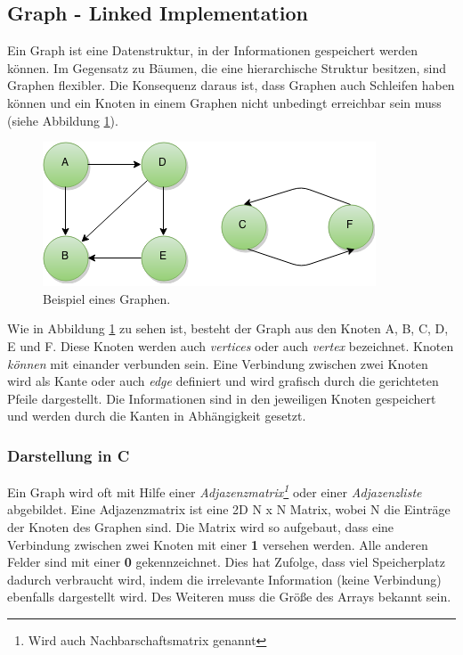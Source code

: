 \subsection{Graph - Linked Implementation}\label{kap:graph} 
Ein Graph ist eine Datenstruktur, in der Informationen gespeichert werden können. Im Gegensatz zu Bäumen, die eine hierarchische Struktur besitzen, sind Graphen flexibler. Die Konsequenz daraus ist, dass Graphen auch Schleifen haben können und ein Knoten in einem Graphen nicht unbedingt erreichbar sein muss (siehe Abbildung \ref{fig:Graph}).
\begin{figure}[h]
	\centering
	\includegraphics[scale=0.5]{images/Graph.png} 
	\caption{Beispiel eines Graphen.}
	\label{fig:Graph}
\end{figure}
Wie in Abbildung \ref{fig:Graph} zu sehen ist, besteht der Graph aus den Knoten A, B, C, D, E und F. Diese Knoten werden auch \textit{vertices} oder auch \textit{vertex} bezeichnet. Knoten \textit{können} mit einander verbunden sein. Eine Verbindung zwischen zwei Knoten wird als Kante oder auch \textit{edge} definiert und wird grafisch durch die gerichteten Pfeile dargestellt. Die Informationen sind in den jeweiligen Knoten gespeichert und werden durch die Kanten in Abhängigkeit gesetzt. 

\subsubsection*{Darstellung in C}
Ein Graph wird oft mit Hilfe einer \textit{Adjazenzmatrix\footnote{Wird auch Nachbarschaftsmatrix genannt}} oder einer \textit{Adjazenzliste} abgebildet. Eine Adjazenzmatrix ist eine 2D N x N Matrix, wobei N die Einträge der Knoten des Graphen sind. Die Matrix wird so aufgebaut, dass eine Verbindung zwischen zwei Knoten mit einer \textbf{1} versehen werden. Alle anderen Felder sind mit einer \textbf{0} gekennzeichnet. Dies hat Zufolge, dass viel Speicherplatz dadurch verbraucht wird, indem die irrelevante Information (keine Verbindung) ebenfalls dargestellt wird. Des Weiteren muss die Größe des Arrays bekannt sein. 

